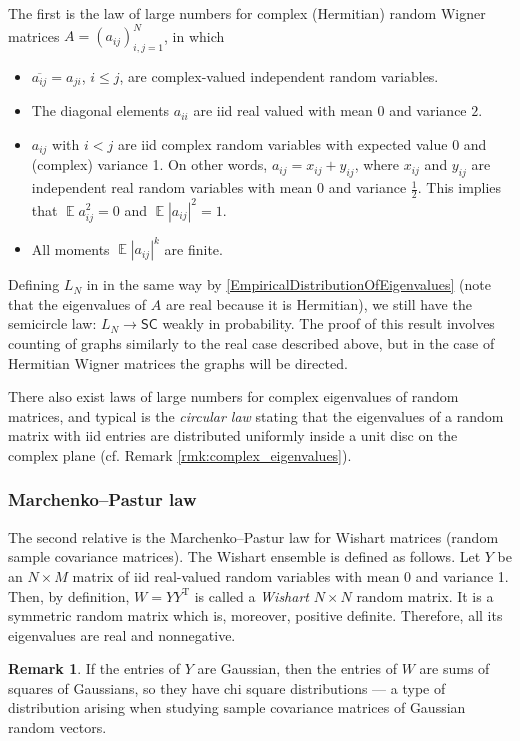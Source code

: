 \documentclass[letterpaper,11pt,oneside,reqno]{amsart}
\numberwithin{equation}{section}
\newcommand{\SC}{\mathsf{SC}}
\DeclareMathOperator{\EE}{\mathbb{E}}
\theoremstyle{definition}
\newtheorem{remark}[proposition]{Remark}
\begin{document}
The first is the law of large numbers for complex (Hermitian) random Wigner
matrices $A= ( a_{ i j } )_{i,j=1}^{N}$, in which
\begin{itemize}
	\item $ \overline{ a_{ i j } } = a_{ j i } $, $i\le j$,
	are complex-valued independent random variables.
	\item The diagonal elements
	$ a_{ i i } $ are iid real valued with mean $0$ and variance $2$.
	\item $ a_{ i j } $ with $ i < j $ are iid complex random variables
	with expected value 0 and (complex) variance 1.
	On other words, $a_{ij}=x_{ij}+y_{ij}$, where $x_{ij}$ and $y_{ij}$ are independent
	real random variables with mean $0$ and variance $\frac12$. This implies that 
	$\EE a_{ij}^{2}=0$ and $\EE |a_{ij}|^{2}=1$.
	\item All moments $\EE|a_{ij}|^{k}$ are finite.
\end{itemize}
Defining $L_N$ in in the same way by \eqref{EmpiricalDistributionOfEigenvalues}
(note that the eigenvalues of $A$ are real because it is Hermitian),
we still have the semicircle law: 
$ L_N \rightarrow \SC $ weakly in probability. The proof of this result involves counting 
of graphs similarly to the real case described above, but in the case of Hermitian Wigner matrices
the graphs will be directed.

There also exist laws of large numbers
for complex eigenvalues of random matrices,
and typical is the \emph{circular law} stating
that the eigenvalues of a random matrix with iid 
entries are distributed uniformly inside a unit disc on the 
complex plane (cf. Remark \ref{rmk:complex_eigenvalues}).



\subsubsection{Marchenko--Pastur law} %
\label{ssub:marchenko_pastur_law}

The second relative is the Marchenko--Pastur law \cite{MarchenkoPastur}
for Wishart matrices (random sample covariance matrices). The Wishart ensemble is defined as follows.
Let $ Y $ be an $ N \times M $ matrix of iid real-valued random variables with mean 0 and variance 1. 
Then, by definition, $ W = Y Y^\text{T} $ is called a \emph{Wishart} $ N \times N $ random matrix.
It is a symmetric random matrix which is, moreover, positive definite.
Therefore, all its eigenvalues are real and nonnegative.
\begin{remark}
	If the entries of $ Y $ are Gaussian, then the entries of $ W $ are sums of squares of Gaussians, 
	so they have chi square distributions --- a type of distribution
	arising when studying sample covariance matrices of Gaussian random vectors.
\end{remark}
\end{document}
